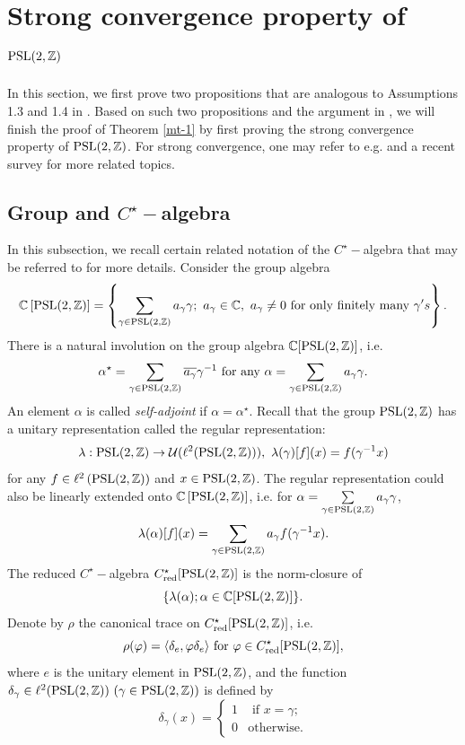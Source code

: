 \documentclass{amsart}
\theoremstyle{plain}
\theoremstyle{definition}
\theoremstyle{remark}
\begin{document}
\section{Strong convergence property of $\textnormal{PSL}(2,\mathbb{Z})$}\label{s-scp}
      In this section, we first prove two propositions that are analogous to Assumptions 1.3 and 1.4 in \cite{MPvH25}. Based on such two propositions and the argument in \cite{MPvH25}, we will finish the proof of Theorem \ref{mt-1} by first proving the strong convergence property of $\textnormal{PSL}(2,\mathbb{Z})$. For strong convergence, one may refer to e.g. \cite{HT05, BC19, CGVTvH24, CGVvH24, MdlS24, LM25} and a recent survey \cite{Hand25} for more related topics.
    \subsection{Group and $C^\star-$algebra}
    In this subsection, we recall certain related notation of the $C^{\star}-$algebra that may be referred to \cite{MPvH25} for more details.
    Consider the group algebra
    $$\mathbb{C}\left[\textnormal{PSL}(2,\mathbb{Z})\right]=\left\{\sum\limits_{\gamma\in\textnormal{PSL}(2,\mathbb{Z})}a_{\gamma}\gamma;\ a_\gamma\in\mathbb{C},\ a_{\gamma}\neq 0\text{ for only finitely many }\gamma's\right\}.$$
    There is a natural involution on the group algebra $\mathbb{C}[\textnormal{PSL}(2,\mathbb{Z})]$, i.e. 
    $$\alpha^{\star}=\sum\limits_{\gamma\in\textnormal{PSL}(2,\mathbb{Z})}\overline{a_{\gamma}}\gamma^{-1} \text{ for any } \alpha=\sum\limits_{\gamma\in\textnormal{PSL}(2,\mathbb{Z})}a_\gamma \gamma.$$
    An element $\alpha$ is called \emph{self-adjoint} if $\alpha=\alpha^\star$. Recall that the group $\textnormal{PSL}(2,\mathbb{Z})$ has a unitary representation called the regular representation:
    $$\lambda:\textnormal{PSL}(2,\mathbb{Z})\to\mathcal{U}(\ell^2(\textnormal{PSL}(2,\mathbb{Z}))),\ \lambda(\gamma)[f](x)=f(\gamma^{-1}x)$$
    for any $f\in\ell^2\left(\textnormal{PSL}(2,\mathbb{Z})\right)$ and $x\in \textnormal{PSL}(2,\mathbb{Z})$.
    The regular representation could also be linearly extended onto $\mathbb{C}\left[\textnormal{PSL}(2,\mathbb{Z})\right]$, i.e. for $\alpha=\sum\limits_{\gamma\in\textnormal{PSL}(2,\mathbb{Z})}a_\gamma \gamma$, 
    $$\lambda(\alpha)[f](x)=\sum\limits_{\gamma\in\textnormal{PSL}(2,\mathbb{Z})}a_\gamma f(\gamma^{-1}x).$$
    The reduced $C^\star-$algebra $C^\star_{\textnormal{red}}[\textnormal{PSL}(2,\mathbb{Z})]$ is the norm-closure of $$\{\lambda(\alpha);\alpha\in\mathbb{C}[\textnormal{PSL}(2,\mathbb{Z})]\}.$$
    Denote by $\rho$ the canonical trace on $C^\star_{\textnormal{red}}[\textnormal{PSL}(2,\mathbb{Z})]$, i.e. $$\rho(\varphi)=\langle\delta_e,\varphi\delta_e\rangle\text{ for } \varphi\in C^\star_{\textnormal{red}}[\textnormal{PSL}(2,\mathbb{Z})],$$ where $e$ is the unitary element in $\textnormal{PSL}(2,\mathbb{Z})$, and the function $\delta_\gamma\in\ell^2(\textnormal{PSL}(2,\mathbb{Z}))\ (\gamma\in\textnormal{PSL}(2,\mathbb{Z}))$ is defined by
        $$\delta_\gamma(x)=\begin{cases}1&\text{ if }x=\gamma;\\ 0 &\text{otherwise}.\end{cases}$$
\end{document}
